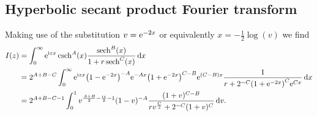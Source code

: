 \documentclass[english, parskip=full]{scrartcl}
\begin{document}
\subsection{Hyperbolic secant product Fourier transform}
Making use of the substitution $v = \text{e}^{-2x}$ or equivalently $x = -\frac{1}{2} \log(v)$ we find
\begin{align}
I(z) &= \intx{0}{\infty}{\powe{\i zx} \csch^A(x) \frac{\sech^B(x)}{1 + r \sech^C(x)}}{x}\\
&= 2^{A+B-C} \intx{0}{\infty}{\powe{\i zx} \kla*{1 - \powe{-2x}}^{-A} \powe{-Ax} \kla*{1 + \powe{-2x}}^{C-B} \powe{(C-B)x} \frac{1}{r + 2^{-C} \kla*{1 + \powe{-2x}}^C \powe{Cx}} }{x}\\
&= 2^{A+B-C-1} \intx{0}{1}{v^{\frac{A+B}{2} -\frac{\i z}{2} -1} (1-v)^{-A} \frac{(1+v)^{C-B}}{rv^\frac{C}{2} + 2^{-C} (1+v)^C}}{v}.
\end{align}
\end{document}
